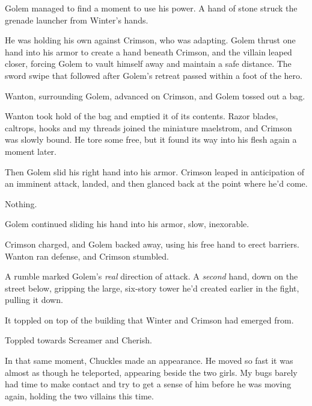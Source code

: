 Golem managed to find a moment to use his power.  A hand of stone struck the grenade launcher from Winter's hands.



He was holding his own against Crimson, who was adapting.  Golem thrust one hand into his armor to create a hand beneath Crimson, and the villain leaped closer, forcing Golem to vault himself away and maintain a safe distance.  The sword swipe that followed after Golem's retreat passed within a foot of the hero.



Wanton, surrounding Golem, advanced on Crimson, and Golem tossed out a bag.



Wanton took hold of the bag and emptied it of its contents.  Razor blades, caltrops, hooks and my threads joined the miniature maelstrom, and Crimson was slowly bound.  He tore some free, but it found its way into his flesh again a moment later.



Then Golem slid his right hand into his armor.  Crimson leaped in anticipation of an imminent attack, landed, and then glanced back at the point where he'd come.



Nothing.



Golem continued sliding his hand into his armor, slow, inexorable.



Crimson charged, and Golem backed away, using his free hand to erect barriers.  Wanton ran defense, and Crimson stumbled.



A rumble marked Golem's \emph{real} direction of attack.  A \emph{second} hand, down on the street below, gripping the large, six-story tower he'd created earlier in the fight, pulling it down.



It toppled on top of the building that Winter and Crimson had emerged from.



Toppled towards Screamer and Cherish.



In that same moment, Chuckles made an appearance.  He moved so fast it was almost as though he teleported, appearing beside the two girls.  My bugs barely had time to make contact and try to get a sense of him before he was moving again, holding the two villains this time.



